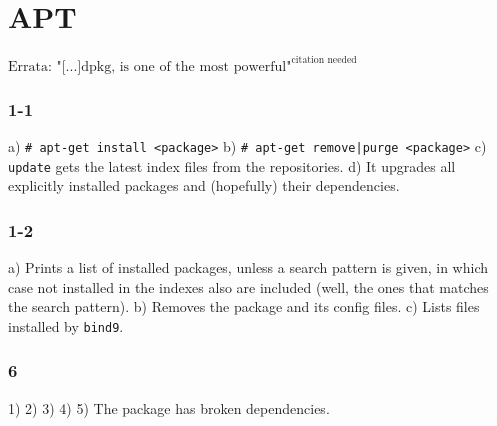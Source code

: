 \chapter{APT}
$\text{Errata: "[...]dpkg, is one of the most powerful"}^{\text{citation needed}}$
\subsection{1-1}
a) \verb=# apt-get install <package>=
b) \verb=# apt-get remove|purge <package>=
c) \verb=update= gets the latest index files from the repositories.
d) It upgrades all explicitly installed packages and (hopefully) their dependencies.

\subsection{1-2}
a) Prints a list of installed packages, unless a search pattern is given, in which case not installed in the indexes also are included (well, the ones that matches the search pattern).
b) Removes the package and its config files.
c) Lists files installed by \verb=bind9=.


%



\subsection{6}
1)
2)
3)
4) 
5) The package has broken dependencies.
